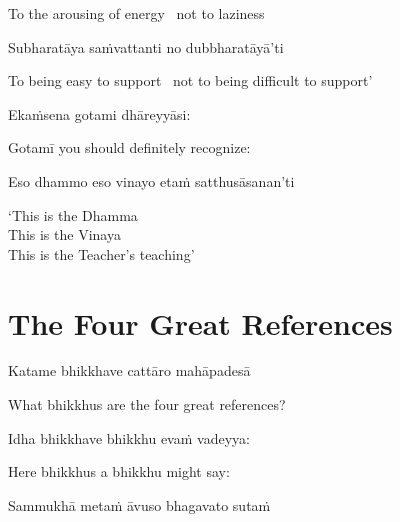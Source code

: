 \begin{english}
  To the arousing of energy \breathmark\ not to laziness
\end{english}

Subharatāya saṁvattanti no dubbharatāyā’ti

\begin{english}
  To being easy to support \breathmark\ not to being difficult to support’
\end{english}

Ekaṁsena gotami dhāreyyāsi:

\begin{english}
  Gotamī
  you should definitely recognize:
\end{english}

Eso dhammo eso vinayo etaṁ satthusāsanan’ti

\begin{english}
  ‘This is the Dhamma\\
  This is the Vinaya\\
  This is the Teacher’s teaching’
\end{english}

\suttaRef{[AN 8.53]}


\section{The Four Great References}
\label{four-great-references}

\begin{leader}
\end{leader}

Katame bhikkhave cattāro mahāpadesā

\begin{english}
  What bhikkhus are the four great references?
\end{english}

Idha bhikkhave bhikkhu evaṁ vadeyya:

\begin{english}
  Here bhikkhus a bhikkhu might say:
\end{english}

Sammukhā metaṁ āvuso bhagavato sutaṁ

